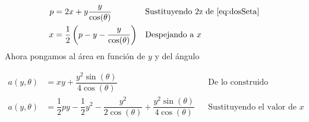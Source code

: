 \documentclass[letterpaper]{article}
\renewcommand{\*}{\cdot}
\theoremstyle{definition}
\begin{document}
\begin{align*}
	p &= 2x + y\dfrac{y}{\cos(\theta)} &&\text{Sustituyendo 2z de }\ref{eq:dosSeta}\\
	x &= \dfrac{1}{2}\left( p -y - \dfrac{y}{\cos(\theta)} \right) &&\text{Despejando a }x\\
\end{align*}
Ahora pongamos al área en función de $ y $ y del ángulo

\begin{align*}
	a(y,\theta) &= xy + \dfrac{y^2\sin(\theta)}{4\cos(\theta)} &&\text{De lo construido anteriormente}\\
	a(y,\theta) &= \dfrac{1}{2}py - \dfrac{1}{2}y^2 - \dfrac{y^2}{2\cos(\theta)} + \dfrac{y^2\sin(\theta)}{4\cos(\theta)} &&\text{Sustituyendo el valor de }x\\
\end{align*}
\end{document}
